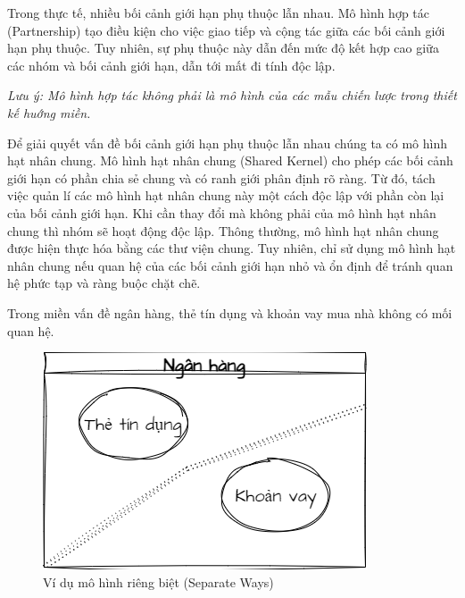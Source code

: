 Trong thực tế,      nhiều    bối cảnh giới hạn phụ thuộc lẫn nhau.   Mô hình hợp tác (Partnership)   tạo điều kiện     cho việc giao tiếp và cộng tác giữa các       bối cảnh giới hạn phụ thuộc. Tuy nhiên,  sự phụ thuộc     này dẫn đến mức độ kết hợp cao giữa các nhóm và bối cảnh giới hạn,  dẫn tới mất đi tính độc lập. 

\textit{Lưu ý:    Mô hình hợp tác  không phải là mô hình  của  các mẫu chiến lược trong thiết kế huớng miền.}  


Để giải quyết vấn đề   bối cảnh giới hạn phụ thuộc lẫn nhau chúng ta có mô hình      hạt nhân chung.  Mô hình hạt nhân chung (Shared Kernel) cho phép   các    bối cảnh giới hạn  có phần chia sẻ chung  và  có  ranh giới   phân định rõ ràng.  Từ đó, tách việc quản lí các mô hình hạt nhân chung này một cách độc lập với phần còn lại của bối cảnh giới hạn. Khi cần  thay đổi mà không phải của mô hình hạt nhân chung thì nhóm sẽ   hoạt động độc lập.    Thông thường, mô hình hạt nhân chung được hiện thực hóa bằng các thư viện chung.      Tuy nhiên, chỉ sử dụng mô hình hạt nhân chung nếu quan hệ của các   bối cảnh giới hạn   nhỏ và ổn định   để tránh    quan hệ    phức tạp và ràng buộc  chặt chẽ.

 


\begin{example} Trong miền vấn đề ngân hàng,     thẻ tín dụng và khoản vay mua nhà không có mối quan hệ. 
    
    \begin{figure}[H]
        
        \centering
        
        \includegraphics[scale = 0.5]{pictures/mo_hinh_rieng_biet_separate_ways/main.drawio.png}
        
        \caption{Ví dụ  mô hình riêng biệt (Separate Ways)  }
        
    \end{figure}
\end{example} 

